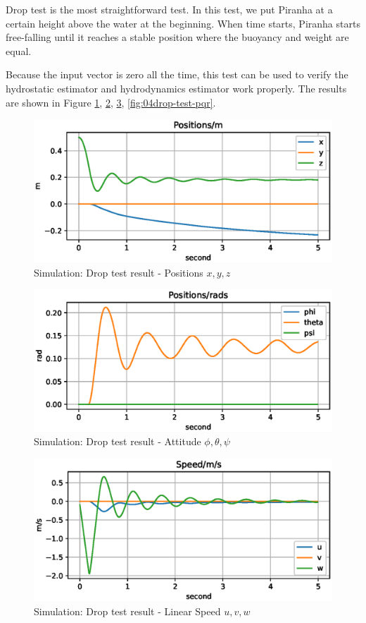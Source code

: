Drop test is the most straightforward test. In this test, we put Piranha at a certain height above the water at the beginning. When time starts, Piranha starts free-falling until it reaches a stable position where the buoyancy and weight are equal.

Because the input vector is zero all the time, this test can be used to verify the hydrostatic estimator and hydrodynamics estimator work properly. The results are shown in Figure \ref{fig:04drop-test-xyz}, \ref{fig:04drop-test-ptp}, \ref{fig:04drop-test-uvw}, \ref{fig:04drop-test-pqr}.

\begin{figure}[H]
    \centering
    \includegraphics[width=.8\textwidth]{images/04drop-test-xyz.eps}
    \caption{Simulation: Drop test result - Positions $x, y,z$}
    \label{fig:04drop-test-xyz}
\end{figure}

\begin{figure}[H]
    \centering
    \includegraphics[width=.8\textwidth]{images/04drop-test-ptp.eps}
    \caption{Simulation: Drop test result - Attitude $\phi, \theta, \psi$}
    \label{fig:04drop-test-ptp}
\end{figure}

\begin{figure}[H]
    \centering
    \includegraphics[width=.8\textwidth]{images/04drop-test-uvw.eps}
    \caption{Simulation: Drop test result - Linear Speed $u, v, w$}
    \label{fig:04drop-test-uvw}
\end{figure}

